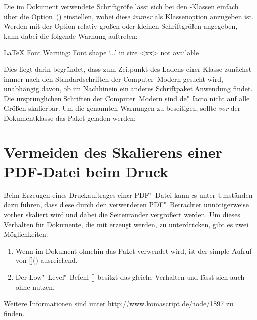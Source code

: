 %
Die im Dokument verwendete Schriftgröße lässt sich bei den \KOMAScript-Klassen 
einfach über die Option~() einstellen, 
wobei diese \emph{immer} als Klassenoption anzugeben ist. Werden mit der Option 
relativ großen oder kleinen Schriftgrößen angegeben, kann dabei die folgende 
Warnung auftreten:
%
\begin{quoting}[rightmargin=0pt]
\begin{Code}
LaTeX Font Warning: Font shape `...' in size <xx> not available
\end{Code}
\end{quoting}
%
Dies liegt darin begründet, dass zum Zeitpunkt des Ladens einer Klasse zunächst 
immer nach den Standardschriften der Computer~Modern gesucht wird, unabhängig 
davon, ob im Nachhinein ein anderes Schriftpaket Anwendung findet. Die 
ursprünglichen Schriften der Computer~Modern sind de"~facto nicht auf alle 
Größen skalierbar. Um die genannten Warnungen zu beseitigen, sollte \emph{vor} 
der Dokumentklasse das Paket  geladen werden:
%
\begin{quoting}[rightmargin=0pt]
\end{quoting}



\section{%
  Vermeiden des Skalierens einer PDF-Datei beim Druck%
}

%
Beim Erzeugen eines Druckauftrages einer PDF"~Datei kann es unter Umständen 
dazu führen, dass diese durch den verwendeten PDF"~Betrachter unnötigerweise 
vorher skaliert wird und dabei die Seitenränder vergrößert werden. Um dieses 
Verhalten für Dokumente, die mit  erzeugt werden, zu 
unterdrücken, gibt es zwei Möglichkeiten:
%
\begin{enumerate}
\item Wenn im Dokument ohnehin das Paket  verwendet wird, 
  ist der simple Aufruf von 
  []()
  ausreichend.
\item Der Low"~Level"~Befehl
  []
  besitzt das gleiche Verhalten und lässt sich auch ohne  
  nutzen.
\end{enumerate}
%
Weitere Informationen sind unter \url{http://www.komascript.de/node/1897} 
zu finden.
